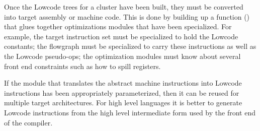 \begin{enumerate}
   Once the Lowcode trees for a cluster have been built, they must
  be converted into target assembly or machine code. This is done by
  building up a function () that
  glues together optimizations modules that have been specialized. For
  example, the target instruction set must be specialized to hold the
  Lowcode constants; the flowgraph must be specialized to carry these
  instructions as well as the Lowcode pseudo-ops; the optimization
  modules must know about several front end constraints such as how to
  spill registers.
  \end{enumerate}

   If the module that translates the abstract machine instructions
  into Lowcode instructions has been appropriately parameterized, then
  it can be reused for multiple target architectures. For high level
  languages it is better to generate Lowcode instructions from the high
  level intermediate form used by the front end of the compiler.
